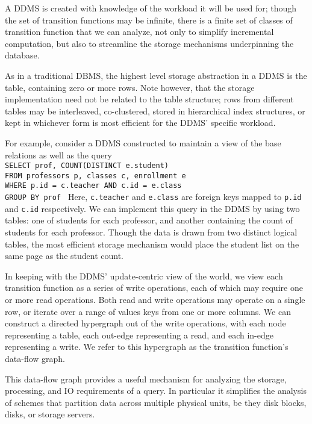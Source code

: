 A DDMS is created with knowledge of the workload it will be used for; though the set of transition functions may be infinite, there is a finite set of classes of transition function that we can analyze, not only to simplify incremental computation, but also to streamline the storage mechanisms underpinning the database.

As in a traditional DBMS, the highest level storage abstraction in a DDMS is the table, containing zero or more rows.  Note however, that the storage implementation need not be related to the table structure; rows from different tables may be interleaved, co-clustered, stored in hierarchical index structures, or kept in whichever form is most efficient for the DDMS' specific workload.  

For example, consider a DDMS constructed to maintain a view of the base relations as well as the query\texttt{\\
SELECT prof, COUNT(DISTINCT e.student)\\
FROM professors p, classes c, enrollment e\\
WHERE p.id = c.teacher AND c.id = e.class\\
GROUP BY prof
}
Here, \texttt{c.teacher} and \texttt{e.class} are foreign keys mapped to \texttt{p.id} and \texttt{c.id} respectively.  We can implement this query in the DDMS by using two tables: one of students for each professor, and another containing the count of students for each professor.  Though the data is drawn from two distinct logical tables, the most efficient storage mechanism would place the student list on the same page as the student count.

In keeping with the DDMS' update-centric view of the world, we view each transition function as a series of write operations, each of which may require one or more read operations.  Both read and write operations may operate on a single row, or iterate over a range of values keys from one or more columns.  We can construct a directed hypergraph out of the write operations, with each node representing a table, each out-edge representing a read, and each in-edge representing a write.  We refer to this hypergraph as the transition function's data-flow graph.

This data-flow graph provides a useful mechanism for analyzing the storage, processing, and IO requirements of a query.  In particular it simplifies the analysis of schemes that partition data across multiple physical units, be they disk blocks, disks, or storage servers.

